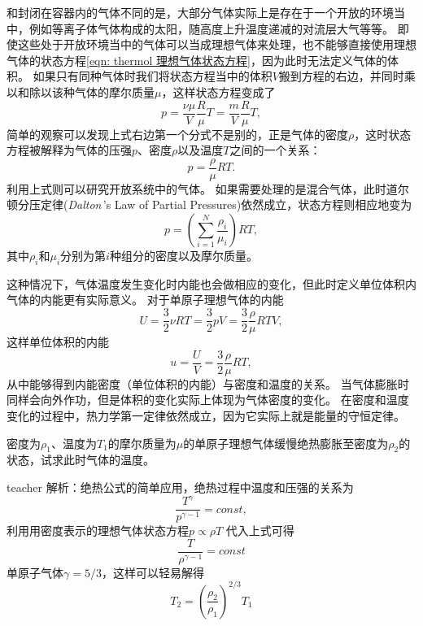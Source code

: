 和封闭在容器内的气体不同的是，大部分气体实际上是存在于一个开放的环境当中，例如等离子体气体构成的太阳，随高度上升温度递减的对流层大气等等。
即使这些处于开放环境当中的气体可以当成理想气体来处理，也不能够直接使用理想气体的状态方程\ref{eqn: thermol 理想气体状态方程}，因为此时无法定义气体的体积。
如果只有同种气体时我们将状态方程当中的体积$V$搬到方程的右边，并同时乘以和除以该种气体的摩尔质量$\mu$，这样状态方程变成了
\begin{equation}
p = \frac{\nu \mu}{V}\frac{R}{\mu}T = \frac{m}{V}\frac{R}{\mu}T,
\end{equation}
简单的观察可以发现上式右边第一个分式不是别的，正是气体的密度$\rho$，这时状态方程被解释为气体的压强$p$、密度$\rho$以及温度$T$之间的一个关系：
\begin{equation}
p=\frac{\rho}{\mu}R T.
\end{equation}
利用上式则可以研究开放系统中的气体。
如果需要处理的是混合气体，此时{\heiti 道尔顿分压定律}(\textit{Dalton\,}'s Law of Partial Pressures)依然成立，状态方程则相应地变为
\begin{equation}
p = \left(\sum_{i=1}^N \frac{\rho_i}{\mu_i}\right)RT,
\end{equation}
其中$\rho_i$和$\mu_i$分别为第$i$种组分的密度以及摩尔质量。

这种情况下，气体温度发生变化时内能也会做相应的变化，但此时定义单位体积内气体的内能更有实际意义。
对于单原子理想气体的内能
\begin{equation}
U = \frac{3}{2}\nu RT = \frac{3}{2}pV = \frac{3}{2}\frac{\rho}{\mu}RT V,
\end{equation}
这样单位体积的内能
\begin{equation}
u = \frac{U}{V} = \frac{3}{2}\frac{\rho}{\mu}RT,
\end{equation}
从中能够得到内能密度（单位体积的内能）与密度和温度的关系。
当气体膨胀时同样会向外作功，但是体积的变化实际上体现为气体密度的变化。
在密度和温度变化的过程中，热力学第一定律依然成立，因为它实际上就是能量的守恒定律。



\begin{example}
密度为$\rho_1$、温度为$T_1$的摩尔质量为$\mu$的单原子理想气体缓慢绝热膨胀至密度为$\rho_2$的状态，试求此时气体的温度。
\begin{taggedblock}{teacher}
\newline
解析：绝热公式的简单应用，绝热过程中温度和压强的关系为
\[
\frac{T^\gamma}{p^{\gamma-1}}=const,
\]
利用用密度表示的理想气体状态方程$p \propto\rho T$ 代入上式可得
\[ \frac{T}{\rho^{\gamma-1}}=const\]
单原子气体$\gamma=5/3$，这样可以轻易解得
\[ T_2 = \left ( \frac{\rho_2}{\rho_1} \right )^{2/3}T_1 \]
\end{taggedblock}
\end{example}



